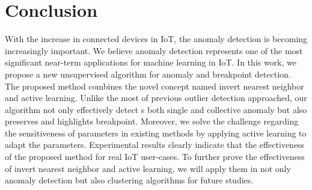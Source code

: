 


\section{Conclusion}

With the increase in connected devices in IoT, the anomaly detection is becoming increasingly important. We believe anomaly detection represents one of the most significant near-term applications for machine learning in IoT. In this work, we propose a new unsupervised algorithm for anomaly and breakpoint detection. The proposed method combines the novel concept named invert nearest neighbor and active learning. Unlike the most of previous outlier detection approached, our algorithm not only effectively detect s both single and collective anomaly but also preserves and highlights breakpoint. Moreover, we solve the challenge regarding the sensitiveness of parameters in existing methods by applying active learning to adapt the parameters. Experimental results clearly indicate that the effectiveness of the proposed method for real IoT user-cases. To further prove the effectiveness of invert nearest neighbor and active learning, we will apply them in not only anomaly detection but also clustering algorithms for future studies. 


